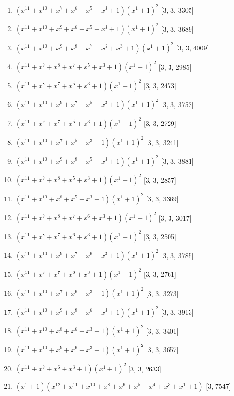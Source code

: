 \documentclass[10pt,twocolumn]{article}
\begin{document}
\begin{enumerate}
\item $(x^{11} + x^{10} + x^{7} + x^{6} + x^{5} + x^{3} + 1)(x^{1} + 1)^{2}$  [3, 3, 3305]
\item $(x^{11} + x^{10} + x^{9} + x^{6} + x^{5} + x^{3} + 1)(x^{1} + 1)^{2}$  [3, 3, 3689]
\item $(x^{11} + x^{10} + x^{9} + x^{8} + x^{7} + x^{5} + x^{3} + 1)(x^{1} + 1)^{2}$  [3, 3, 4009]
\item $(x^{11} + x^{9} + x^{8} + x^{7} + x^{5} + x^{3} + 1)(x^{1} + 1)^{2}$  [3, 3, 2985]
\item $(x^{11} + x^{8} + x^{7} + x^{5} + x^{3} + 1)(x^{1} + 1)^{2}$  [3, 3, 2473]
\item $(x^{11} + x^{10} + x^{9} + x^{7} + x^{5} + x^{3} + 1)(x^{1} + 1)^{2}$  [3, 3, 3753]
\item $(x^{11} + x^{9} + x^{7} + x^{5} + x^{3} + 1)(x^{1} + 1)^{2}$  [3, 3, 2729]
\item $(x^{11} + x^{10} + x^{7} + x^{5} + x^{3} + 1)(x^{1} + 1)^{2}$  [3, 3, 3241]
\item $(x^{11} + x^{10} + x^{9} + x^{8} + x^{5} + x^{3} + 1)(x^{1} + 1)^{2}$  [3, 3, 3881]
\item $(x^{11} + x^{9} + x^{8} + x^{5} + x^{3} + 1)(x^{1} + 1)^{2}$  [3, 3, 2857]
\item $(x^{11} + x^{10} + x^{8} + x^{5} + x^{3} + 1)(x^{1} + 1)^{2}$  [3, 3, 3369]
\item $(x^{11} + x^{9} + x^{8} + x^{7} + x^{6} + x^{3} + 1)(x^{1} + 1)^{2}$  [3, 3, 3017]
\item $(x^{11} + x^{8} + x^{7} + x^{6} + x^{3} + 1)(x^{1} + 1)^{2}$  [3, 3, 2505]
\item $(x^{11} + x^{10} + x^{9} + x^{7} + x^{6} + x^{3} + 1)(x^{1} + 1)^{2}$  [3, 3, 3785]
\item $(x^{11} + x^{9} + x^{7} + x^{6} + x^{3} + 1)(x^{1} + 1)^{2}$  [3, 3, 2761]
\item $(x^{11} + x^{10} + x^{7} + x^{6} + x^{3} + 1)(x^{1} + 1)^{2}$  [3, 3, 3273]
\item $(x^{11} + x^{10} + x^{9} + x^{8} + x^{6} + x^{3} + 1)(x^{1} + 1)^{2}$  [3, 3, 3913]
\item $(x^{11} + x^{10} + x^{8} + x^{6} + x^{3} + 1)(x^{1} + 1)^{2}$  [3, 3, 3401]
\item $(x^{11} + x^{10} + x^{9} + x^{6} + x^{3} + 1)(x^{1} + 1)^{2}$  [3, 3, 3657]
\item $(x^{11} + x^{9} + x^{6} + x^{3} + 1)(x^{1} + 1)^{2}$  [3, 3, 2633]
\item $(x^{1} + 1)(x^{12} + x^{11} + x^{10} + x^{8} + x^{6} + x^{5} + x^{4} + x^{3} + x^{1} + 1)$  [3, 7547]

\end{enumerate}
\end{document}
